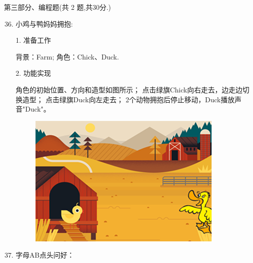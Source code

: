 \documentclass[10pt, a4paper]{article}
\begin{document}
    \newpage
    {\noindent\heiti 第三部分、编程题(共 2 题,共30分.)}
    \begin{enumerate}
        \setcounter{enumi}{35}
        
        \item 小鸡与鸭妈妈拥抱:
 
        1. 准备工作
        \begin{tasks}[label = (\arabic*)]
            \task 背景：Farm;
            \task 角色：Chick、Duck.
        \end{tasks}
        2. 功能实现
        \begin{tasks}[label = (\arabic*)]
            \task 角色的初始位置、方向和造型如图所示；
            \task 点击绿旗Chick向右走去，边走边切换造型；
            \task 点击绿旗Duck向左走去；
            \task 2个动物拥抱后停止移动，Duck播放声音"Duck"。
        \end{tasks}
        \begin{figure}[htbp]
            \centering
            \includegraphics[width=.4\textwidth]{36.png}
        \end{figure}
            
        \item 字母AB点头问好：
        

\end{enumerate}
\end{document}
